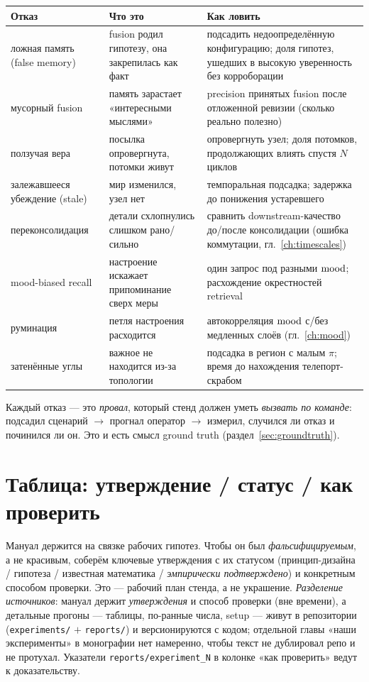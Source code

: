 \begin{center}
\begin{tabular}{p{} p{} p{}}
\toprule
\textbf{Отказ} & \textbf{Что это} & \textbf{Как ловить} \\
\midrule
ложная память (false memory) & fusion родил гипотезу, она закрепилась как факт & подсадить недоопределённую конфигурацию; доля гипотез, ушедших в высокую уверенность без корроборации \\
мусорный fusion & память зарастает «интересными мыслями» & precision принятых fusion после отложенной ревизии (сколько реально полезно) \\
ползучая вера & посылка опровергнута, потомки живут & опровергнуть узел; доля потомков, продолжающих влиять спустя $N$ циклов \\
залежавшееся убеждение (stale) & мир изменился, узел нет & темпоральная подсадка; задержка до понижения устаревшего \\
переконсолидация & детали схлопнулись слишком рано/сильно & сравнить downstream-качество до/после консолидации (ошибка коммутации, гл.~\ref{ch:timescales}) \\
mood-biased recall & настроение искажает припоминание сверх меры & один запрос под разными $\mathrm{mood}$; расхождение окрестностей retrieval \\
руминация & петля настроения расходится & автокорреляция $\mathrm{mood}$ с/без медленных слоёв (гл.~\ref{ch:mood}) \\
затенённые углы & важное не находится из-за топологии & подсадка в регион с малым $\pi$; время до нахождения телепорт-скрабом \\
\bottomrule
\end{tabular}
\end{center}

Каждый отказ — это \emph{провал}, который стенд должен уметь \emph{вызвать по
команде}: подсадил сценарий $\to$ прогнал оператор $\to$ измерил, случился ли отказ и
починился ли он. Это и есть смысл ground truth (раздел~\ref{sec:groundtruth}).

\section{Таблица: утверждение / статус / как проверить}
\label{sec:claimtable}

Мануал держится на связке рабочих гипотез. Чтобы он был \emph{фальсифицируемым}, а не
красивым, соберём ключевые утверждения с их статусом (принцип-дизайна /
гипотеза / известная математика / \emph{эмпирически подтверждено}) и конкретным способом
проверки. Это — рабочий план стенда, а не украшение. \emph{Разделение источников}: мануал
держит \emph{утверждения} и способ проверки (вне времени), а детальные прогоны — таблицы,
по-ранные числа, setup — живут в репозитории (\texttt{experiments/} $+$ \texttt{reports/})
и версионируются с кодом; отдельной главы «наши эксперименты» в монографии нет намеренно,
чтобы текст не дублировал репо и не протухал. Указатели \texttt{reports/experiment\_N} в
колонке «как проверить» ведут к доказательству.


